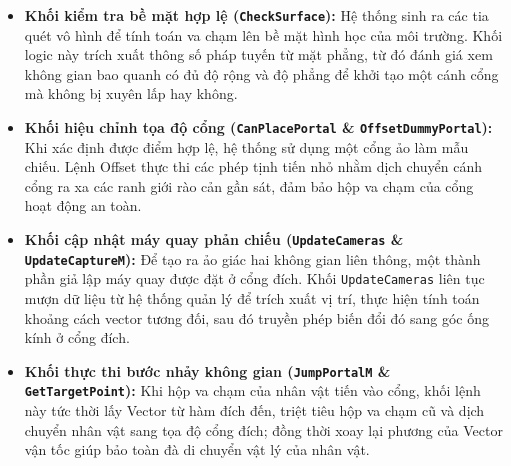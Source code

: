 \documentclass[../DoAn.tex]{subfiles}
\begin{document}
\begin{itemize}
    \item \textbf{Khối kiểm tra bề mặt hợp lệ (\texttt{CheckSurface}):} Hệ thống sinh ra các tia quét vô hình để tính toán va chạm lên bề mặt hình học của môi trường. Khối logic này trích xuất thông số pháp tuyến từ mặt phẳng, từ đó đánh giá xem không gian bao quanh có đủ độ rộng và độ phẳng để khởi tạo một cánh cổng mà không bị xuyên lấp hay không.
    \item \textbf{Khối hiệu chỉnh tọa độ cổng (\texttt{CanPlacePortal} \& \texttt{OffsetDummyPortal}):} Khi xác định được điểm hợp lệ, hệ thống sử dụng một cổng ảo làm mẫu chiếu. Lệnh Offset thực thi các phép tịnh tiến nhỏ nhằm dịch chuyển cánh cổng ra xa các ranh giới rào cản gần sát, đảm bảo hộp va chạm của cổng hoạt động an toàn.
    \item \textbf{Khối cập nhật máy quay phản chiếu (\texttt{UpdateCameras} \& \texttt{UpdateCaptureM}):} Để tạo ra ảo giác hai không gian liên thông, một thành phần giả lập máy quay được đặt ở cổng đích. Khối \texttt{UpdateCameras} liên tục mượn dữ liệu từ hệ thống quản lý để trích xuất vị trí, thực hiện tính toán khoảng cách vector tương đối, sau đó truyền phép biến đổi đó sang góc ống kính ở cổng đích.
    \item \textbf{Khối thực thi bước nhảy không gian (\texttt{JumpPortalM} \& \texttt{GetTargetPoint}):} Khi hộp va chạm của nhân vật tiến vào cổng, khối lệnh này tức thời lấy Vector từ hàm đích đến, triệt tiêu hộp va chạm cũ và dịch chuyển nhân vật sang tọa độ cổng đích; đồng thời xoay lại phương của Vector vận tốc giúp bảo toàn đà di chuyển vật lý của nhân vật.
\end{itemize}
\end{document}
